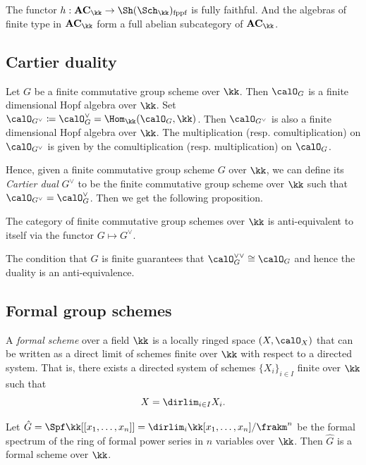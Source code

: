 The functor $h: \mathbf{AC}_\kk \to \Sh(\Sch_\kk)_{\text{fppf}}$ is fully faithful.
And the algebras of finite type in $\mathbf{AC}_\kk$ form a full abelian subcategory of $\mathbf{AC}_\kk$.


\subsection{Cartier duality}

Let $G$ be a finite commutative group scheme over $\kk$.
Then $\calO_G$ is a finite dimensional Hopf algebra over $\kk$.
Set $\calO_{G^\vee} \coloneqq \calO_G^\vee = \Hom_\kk(\calO_G, \kk)$.
Then $\calO_{G^\vee}$ is also a finite dimensional Hopf algebra over $\kk$.
The multiplication (resp. comultiplication) on $\calO_{G^\vee}$ is given by the comultiplication (resp. multiplication) on $\calO_G$.

Hence, given a finite commutative group scheme $G$ over $\kk$, we can define its \emph{Cartier dual} $G^\vee$ to be the finite commutative group scheme over $\kk$ such that $\calO_{G^\vee} = \calO_G^\vee$.
Then we get the following proposition.

\begin{proposition}
	The category of finite commutative group schemes over $\kk$ is anti-equivalent to itself via the functor $G \mapsto G^\vee$.
\end{proposition}

\begin{remark}
	The condition that $G$ is finite guarantees that $\calO_G^{\vee\vee} \cong \calO_G$ and hence the duality is an anti-equivalence.
\end{remark}


\subsection{Formal group schemes}

\begin{definition}
	A \emph{formal scheme} over a field $\kk$ is a locally ringed space $(X, \calO_X)$ that can be written as a direct limit of schemes finite over $\kk$ with respect to a directed system.
	That is, there exists a directed system of schemes $\{X_i\}_{i \in I}$ finite over $\kk$ such that
	\[ X = \dirlim_{i \in I} X_i. \]
\end{definition}

\begin{example}
	Let $\hat{G} = \Spf \kk[[x_1, \ldots, x_n]] = \dirlim_{i} \kk[x_1,\ldots,x_n]/\frakm^n$ be the formal spectrum of the ring of formal power series in $n$ variables over $\kk$.
	Then $\hat{G}$ is a formal scheme over $\kk$.
\end{example}

